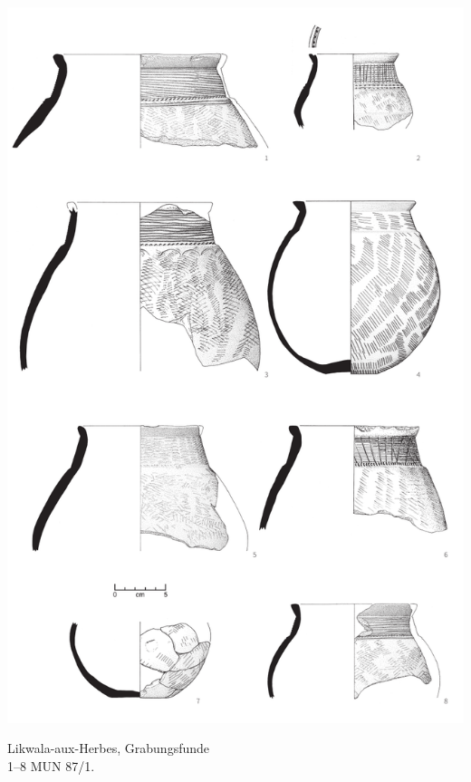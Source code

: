 \begin{pl}[H]
	\includegraphics{plt/Taf89.pdf}
	\vspace{.75em}\caption{Likwala-aux-Herbes, Grabungsfunde \\ 1--8 MUN 87/1.}
	\label{pl:89}
\end{pl}

